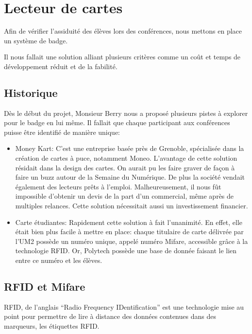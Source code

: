 \chapter{Lecteur de cartes}

Afin de vérifier l'assiduité des élèves lors des conférences, nous mettons en
place un système de badge.

Il nous fallait une solution alliant plusieurs critères comme un coût et temps
de développement réduit et de la fabilité.

    \section{Historique}

Dès le début du projet, Monsieur Berry nous a proposé plusieurs pistes à 
explorer pour le badge en lui même. Il fallait que chaque participant aux
conférences puisse être identifié de manière unique:

    \begin{itemize}
    \item Money Kart: C'est une entreprise basée près de Grenoble, spécialisée
    dans la création de cartes à puce, notamment Moneo. L'avantage de cette solution
    résidait dans la design des cartes. On aurait pu les faire graver
    de façon à faire un buzz autour de la Semaine du Numérique. De plus la société
    vendait également des lecteurs prêts à l'emploi.
    Malheureusement, il nous fût impossible d'obtenir un devis de la part d'un
    commercial, même après de multiples relances. Cette solution nécessitait aussi
    un investissement financier.
    \item Carte étudiantes: Rapidement cette solution à fait l'unanimité. En effet,
    elle était bien plus facile à mettre en place: chaque titulaire de carte délivrée
    par l'UM2 possède un numéro unique, appelé numéro Mifare, accessible grâce à
    la technologie RFID. Or, Polytech possède une base de donnée faisant le lien entre
    ce numéro et les élèves.
    \end{itemize}

    \section{RFID et Mifare}

RFID, de l'anglais ``Radio Frequency IDentification'' est une technologie 
mise au point pour permettre de lire à distance des données contenues dans des
marqueurs, les étiquettes RFID.

